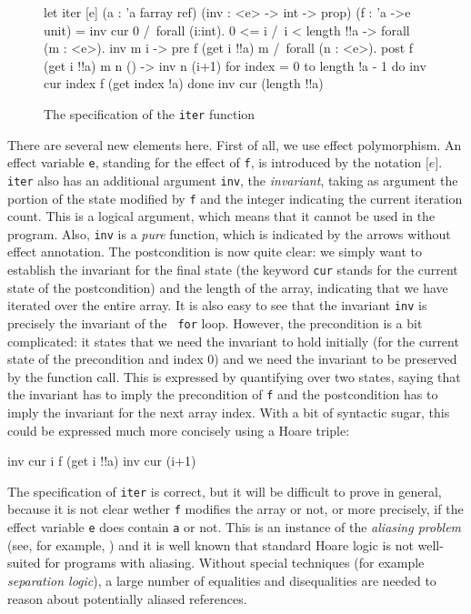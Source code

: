 \documentclass[a4paper]{llncs}
\begin{document}
\begin{figure}[tbp]
\begin{who}[lines]
let iter [e] (a : 'a farray ref) (inv : <e> -> int ->  prop)
  (f : 'a ->{e} unit) =
  { inv cur 0 /\ forall (i:int). 0 <= i /\ i < length !!a ->
    forall (m : <e>).  inv m i -> pre f (get i !!a) m /\
    forall (n : <e>).  post f (get i !!a) m n () -> inv n (i+1)
  }
  for index = 0 to length !a - 1 do
    { inv cur index }
    f (get index !a)
  done
  {inv cur (length !!a) }
\end{who}
\caption{The specification of the {\tt iter} function}
  \label{fig:iter}
\end{figure}

There are several new elements here. First of all, we use effect polymorphism.
An effect variable {\tt e}, standing for the effect of {\tt f}, is introduced
by the notation ${\mathtt [e]}$.  {\tt iter} also has an additional argument
{\tt inv}, the {\em invariant}, taking as argument the portion of the state
modified by {\tt f} and the integer indicating the current iteration count.
This is a logical argument, which means that it cannot be used in the program.
Also, {\tt inv} is a {\em pure} function, which is indicated by the arrows
without effect annotation. The postcondition is now quite clear: we simply
want to establish the invariant for the final state (the keyword {\tt cur}
stands for the current state of the postcondition) and the length of the
array, indicating that we have iterated over the entire array. It is also easy
to see that the invariant {\tt inv} is precisely the invariant of the {\tt
for} loop.  However, the precondition is a bit complicated: it states that we
need the invariant to hold initially (for the current state of the
precondition and index $0$) and we need the invariant to be preserved by the
function call.  This is expressed by quantifying over two states, saying that
the invariant has to imply the precondition of {\tt f} and the postcondition
has to imply the invariant for the next array index.  With a bit of syntactic
sugar, this could be expressed much more concisely using a Hoare triple:
\begin{who} 
  { inv cur i } f (get i !!a) { inv cur (i+1) } 
\end{who}

The specification of {\tt iter} is correct, but it will be difficult to prove
in general, because it is not clear wether {\tt f} modifies the array or not,
or more precisely, if the effect variable {\tt e} does contain {\tt a} or not.
This is an instance of the {\em aliasing problem} (see, for
example, \cite{reynolds78popl}) and it is well known that standard Hoare logic
is not well-suited for programs with aliasing. Without special techniques (for
example {\em separation logic}), a large number of equalities and disequalities
are needed to reason about potentially aliased references. 
\end{document}
